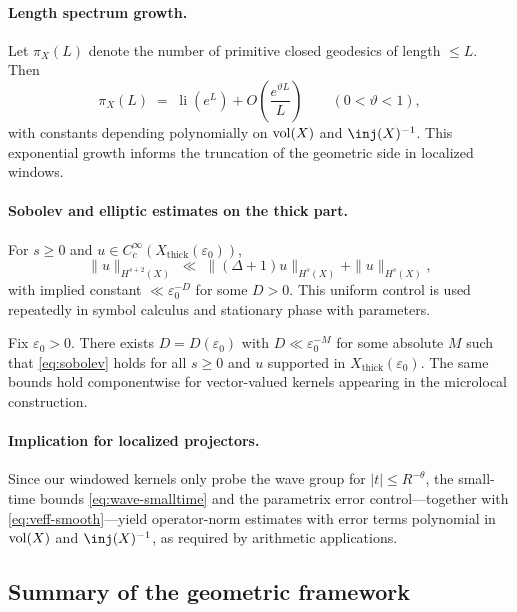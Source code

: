 \paragraph{Length spectrum growth.}
Let $\pi_X(L)$ denote the number of primitive closed geodesics of length $\le L$. Then
\begin{equation}\label{eq:pgthm}
  \pi_X(L) \;=\; \operatorname{li}(e^L) + O\!\left(\frac{e^{\vartheta L}}{L}\right)
  \qquad (0<\vartheta<1),
\end{equation}
with constants depending polynomially on $\operatorname{vol}(X)$ and $\inj(X)^{-1}$. This exponential growth informs the truncation of the geometric side in localized windows.

\paragraph{Sobolev and elliptic estimates on the thick part.}
For $s\ge 0$ and $u\in C^\infty_c(X_{\mathrm{thick}}(\varepsilon_0))$,
\begin{equation}\label{eq:sobolev}
  \|u\|_{H^{s+2}(X)} \;\ll\; \|(\Delta+1)u\|_{H^{s}(X)} + \|u\|_{H^{s}(X)},
\end{equation}
with implied constant $\ll \varepsilon_0^{-D}$ for some $D>0$. This uniform control is used repeatedly in symbol calculus and stationary phase with parameters.

\begin{proposition}\label{prop:uniform-sobolev}
Fix $\varepsilon_0>0$. There exists $D=D(\varepsilon_0)$ with $D\ll \varepsilon_0^{-M}$ for some absolute $M$ such that \eqref{eq:sobolev} holds for all $s\ge 0$ and $u$ supported in $X_{\mathrm{thick}}(\varepsilon_0)$. The same bounds hold componentwise for vector-valued kernels appearing in the microlocal construction.
\end{proposition}

\paragraph{Implication for localized projectors.}
Since our windowed kernels only probe the wave group for $|t|\le R^{-\theta}$, the small-time bounds \eqref{eq:wave-smalltime} and the parametrix error control—together with \eqref{eq:veff-smooth}—yield operator-norm estimates with error terms polynomial in $\operatorname{vol}(X)$ and $\inj(X)^{-1}$, as required by arithmetic applications.

\medskip

\subsection{Summary of the geometric framework}\label{subsec:geometry-summary}

